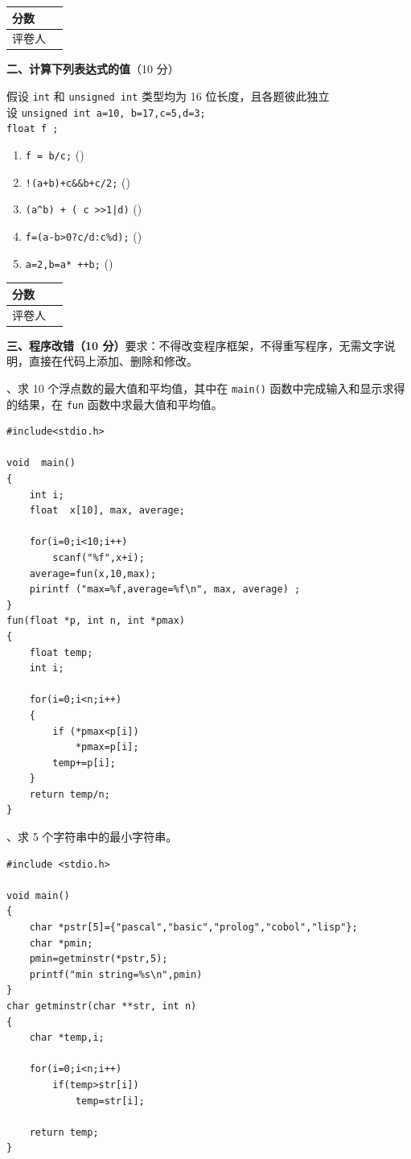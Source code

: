 \documentclass[a4paper,11pt]{ctexart}
\newcommand{\ansbox}{\hfill(\qquad\quad)}
\newcommand{\secbox}[2]{%
  \noindent\begin{tabular}{|>{\centering\arraybackslash}m{1.5cm}|>{\centering\arraybackslash}m{1.5cm}|}
    \hline
    分\quad 数 & \\ \hline
    评卷人 & \\ \hline
  \end{tabular}\hspace{0.8em}%
  \begin{minipage}[c]{\dimexpr\textwidth-4.2cm\relax}
    \textbf{#1}#2
  \end{minipage}\par\vspace{0.5em}%
}
\begin{document}
\vspace{8pt}

\secbox{二、计算下列表达式的值}{（10 分）}

\noindent 假设 \texttt{int} 和 \texttt{unsigned int} 类型均为 16 位长度，且各题彼此独立\\
设 \texttt{unsigned int  a=10, b=17,c=5,d=3;}\\
\phantom{设 }\texttt{float f ;}

\begin{enumerate}[label=(\arabic*), leftmargin=2.4em, itemsep=3pt]
  \item \texttt{f = b/c;} \ansbox
  \item \texttt{!(a+b)+c\&\&b+c/2;} \ansbox
  \item \texttt{(a\^{}b) + ( c >>1|d)} \ansbox
  \item \texttt{f=(a-b>0?c/d:c\%d);} \ansbox
  \item \texttt{a=2,b=a* ++b;} \ansbox
\end{enumerate}

\vspace{8pt}

\secbox{三、程序改错（10 分）}{要求：不得改变程序框架，不得重写程序，无需文字说明，直接在代码上添加、删除和修改。}

、求 10 个浮点数的最大值和平均值，其中在 \texttt{main()} 函数中完成输入和显示求得的结果，在 \texttt{fun} 函数中求最大值和平均值。
\begin{lstlisting}
#include<stdio.h>

void  main()
{
    int i;
    float  x[10], max, average;

    for(i=0;i<10;i++)
        scanf("%f",x+i);
    average=fun(x,10,max);
    pirintf ("max=%f,average=%f\n", max, average) ;
}
fun(float *p, int n, int *pmax)
{
    float temp;
    int i;

    for(i=0;i<n;i++)
    {
        if (*pmax<p[i])
            *pmax=p[i];
        temp+=p[i];
    }
    return temp/n;
}
\end{lstlisting}

、求 5 个字符串中的最小字符串。
\begin{lstlisting}
#include <stdio.h>

void main()
{
    char *pstr[5]={"pascal","basic","prolog","cobol","lisp"};
    char *pmin;
    pmin=getminstr(*pstr,5);
    printf("min string=%s\n",pmin)
}
char getminstr(char **str, int n)
{
    char *temp,i;

    for(i=0;i<n;i++)
        if(temp>str[i])
            temp=str[i];

    return temp;
}
\end{lstlisting}
\end{document}
